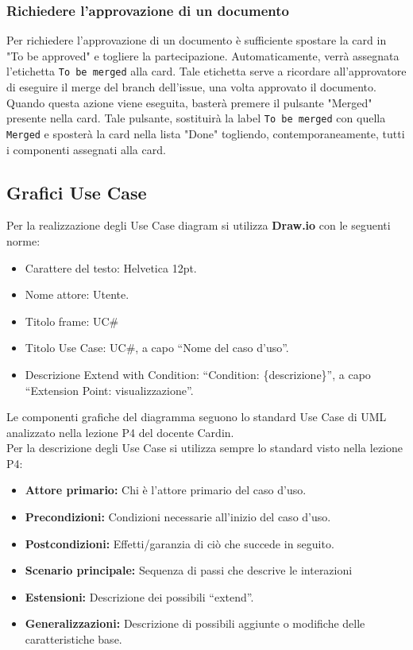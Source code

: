 \subsubsection{Richiedere l'approvazione di un documento}
Per richiedere l'approvazione di un documento è sufficiente spostare la card in "To be approved" e togliere la partecipazione. Automaticamente, verrà assegnata l'etichetta \texttt{To be merged} alla card. Tale etichetta serve a ricordare all'approvatore di eseguire il merge del branch dell'issue, una volta approvato il documento.
Quando questa azione viene eseguita, basterà premere il pulsante "Merged" presente nella card. Tale pulsante, sostituirà la label \texttt{To be merged} con quella \texttt{Merged} e sposterà la card nella lista "Done" togliendo, contemporaneamente, tutti i componenti assegnati alla card.

\subsection{Grafici Use Case}
Per la realizzazione degli Use Case diagram si utilizza \textbf{Draw.io} con le seguenti norme:
\begin{itemize}
\item Carattere del testo: Helvetica 12pt.
\item Nome attore: Utente.
\item Titolo frame: UC\#
\item Titolo Use Case: UC\#, a capo ``Nome del caso d'uso''.
\item Descrizione Extend with Condition: ``Condition: \{descrizione\}'', a capo ``Extension Point: visualizzazione''.
\end{itemize}
Le componenti grafiche del diagramma seguono lo standard Use Case di UML analizzato nella lezione P4 del docente Cardin. \\

\noindent Per la descrizione degli Use Case si utilizza sempre lo standard visto nella lezione P4:
\begin{itemize}
	\item \textbf{Attore primario:} Chi è l'attore primario del caso d'uso.
	\item \textbf{Precondizioni:} Condizioni necessarie all'inizio del caso d'uso.
	\item \textbf{Postcondizioni:} Effetti/garanzia di ciò che succede in seguito.
	\item \textbf{Scenario principale:} Sequenza di passi che descrive le interazioni
	\item \textbf{Estensioni:} Descrizione dei possibili ``extend''.
	\item \textbf{Generalizzazioni:} Descrizione di possibili aggiunte o modifiche delle caratteristiche base.
\end{itemize}


